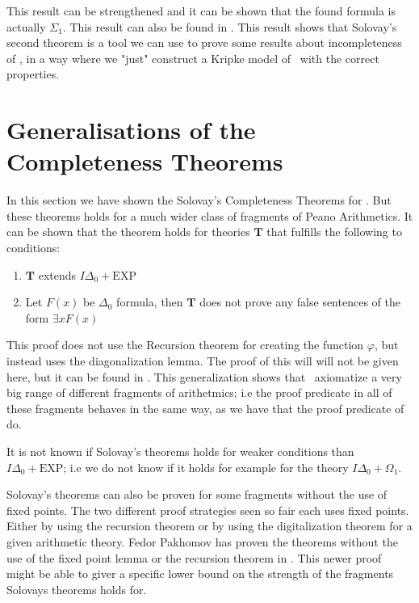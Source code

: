\documentclass[../main.tex]{subfiles}
\begin{document}
This result can be strengthened and it can be shown that the found formula is
actually $\Sigma_1$. This result can also be found in \parencite{Smor1985}.
This result shows that Solovay's second theorem is a tool we can use to prove
some results about incompleteness of \PRA, in a way where we "just" construct a
Kripke model of \GL\ with the correct properties.
\section{Generalisations  of the Completeness Theorems}

In this section we have shown the Solovay's Completeness Theorems for \PRA.
But these theorems holds for a much wider class of fragments of Peano
Arithmetics. It can be shown that the theorem holds for
theories $\textbf{T}$ that fulfills the following to conditions:
\begin{enumerate}
	\item $\textbf{T}$ extends $I\Delta_0+\text{EXP}$
	\item Let $F(x)$ be $ \Delta_0$ formula, then $\textbf{T}$ does not prove any
		false sentences of the form $\exists x F(x)$
\end{enumerate}

This proof does not use the Recursion theorem for creating the function
$\varphi$, but instead uses the diagonalization lemma. The
proof of this will will not be given here, but it can be found in
\parencite{Dick1991}. This generalization shows that \GL\ axiomatize a very big
range of different fragments of arithetmics; i.e the proof predicate in all of
these fragments behaves in the same way, as we have that the proof predicate of
\PRA do.

It is not known if Solovay's theorems holds for weaker conditions than
$I\Delta_0+\text{EXP}$; i.e we do not know if it holds for example for the theory
$I\Delta_0+\Omega_1$.



Solovay's theorems can also be proven for some fragments without the use of
fixed points. The two different proof strategies seen so fair each uses fixed
points. Either by using the recursion theorem or by using the digitalization
theorem for a given arithmetic theory. Fedor Pakhomov has proven the theorems
without the use of the fixed point lemma or the recursion theorem in
\parencite{Fedo2017}. This
newer proof might be able to giver a specific lower bound on the strength of
the fragments Solovays theorems holds for.
\end{document}
